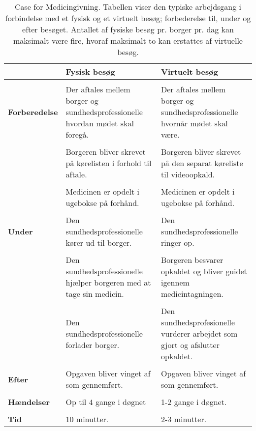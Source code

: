 \begin{table}[H]
	\caption{Case for Medicingivning. Tabellen viser den typiske arbejdsgang i forbindelse med et fysisk og et virtuelt besøg; forbederelse til, under og efter besøget. Antallet af fysiske besøg pr. borger pr. dag kan maksimalt være fire, hvoraf maksimalt to kan erstattes af virtuelle besøg.}
	\centering
	\label{tab:Case}
	\begin{tabularx}{\textwidth}{|l|X|X|}
		
		\hline
		  & \textbf{Fysisk besøg} & \textbf{Virtuelt besøg}\\ \hline
		& & \\\textbf{Forberedelse} & Der aftales mellem borger og sundhedsprofessionelle hvordan mødet skal foregå. & Der aftales mellem borger og sundhedsprofessionelle hvornår mødet skal være.\\ & &\\
		 & Borgeren bliver skrevet på kørelisten i forhold til aftale. & Borgeren bliver skrevet på den separat køreliste til videoopkald.\\  & &\\
		 & Medicinen er opdelt i ugebokse på forhånd. & Medicinen er opdelt i ugebokse på forhånd.\\[4ex] \hline & & \\
		\textbf{ Under} & Den sundhedsprofessionelle kører ud til borger. & Den sundhedsprofessionelle ringer op.\\  & &\\
		  & Den sundhedsprofessionelle hjælper borgeren med at tage sin medicin. & Borgeren besvarer opkaldet og bliver guidet igennem medicintagningen.\\ & &\\
		  & Den sundhedsprofessionelle forlader borger. & Den sundhedsprofesionelle vurderer arbejdet som gjort og afslutter opkaldet.\\[4ex] \hline & & \\\textbf{Efter} & Opgaven bliver vinget af som gennemført. & Opgaven bliver vinget af som gennemført.\\[4ex] \hline
		  & & \\\textbf{Hændelser} & Op til 4 gange i døgnet & 1-2 gange i døgnet.\\ [4ex] \hline
		  & & \\\textbf{Tid} & 10 minutter. & 2-3 minutter.\\[4ex] \hline
	\end{tabularx}
\end{table}


